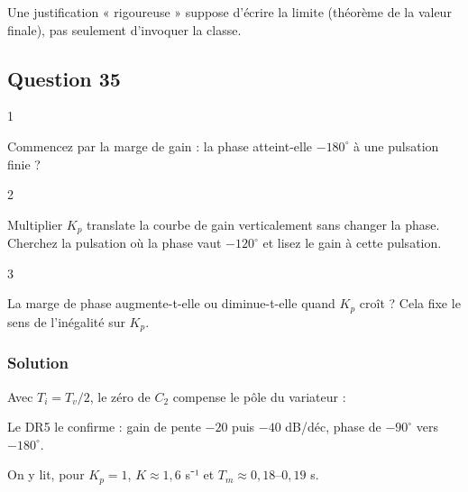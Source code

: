 \documentclass[11pt,a4paper]{article}
\newcommand{\equationajustee}[1]{%
  \sbox{\boiteequation}{$\displaystyle #1$}%
  \ifdim\wd\boiteequation>\linewidth
    \[\resizebox{\linewidth}{!}{\usebox{\boiteequation}}\]%
  \else
    \[#1\]%
  \fi}
\begin{document}
\begin{jury}

Une justification « rigoureuse » suppose d'écrire la limite (théorème de la valeur finale), pas seulement d'invoquer la classe.

\end{jury}

\hypertarget{question-35}{%
\subsection{Question 35}\label{question-35}}

\begin{indication}{1}

Commencez par la marge de gain : la phase atteint-elle \(-180^\circ\) à une pulsation finie ?

\end{indication}

\begin{indication}{2}

Multiplier \(K_p\) translate la courbe de gain verticalement sans changer la phase. Cherchez la pulsation où la phase vaut \(-120^\circ\) et lisez le gain à cette pulsation.

\end{indication}

\begin{indication}{3}

La marge de phase augmente-t-elle ou diminue-t-elle quand \(K_p\) croît ? Cela fixe le sens de l'inégalité sur \(K_p\).

\end{indication}

\hypertarget{solution-34}{%
\subsubsection{Solution}\label{solution-34}}

Avec \(T_i=T_v/2\), le zéro de \(C_2\) compense le pôle du variateur :

\equationajustee{H_{bo}(p)=\frac{K}{p\,(1+T_m\,p)}.}

Le DR5 le confirme : gain de pente \(-20\) puis \(-40\) dB/déc, phase de \(-90^\circ\) vers \(-180^\circ\).

On y lit, pour \(K_p=1\), \(K\approx1{,}6\) s⁻¹ et \(T_m\approx0{,}18\)--\(0{,}19\) s.
\end{document}
